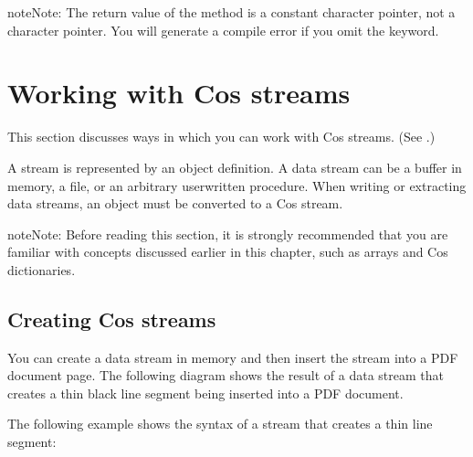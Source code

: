 \documentclass[letterpaper,12pt,english,openany,oneside]{sphinxmanual}
\begin{document}
\begin{sphinxadmonition}{note}{Note:}
The return value of the  method is a constant character pointer, not a character pointer. You will generate a compile error if you omit the  keyword.
\end{sphinxadmonition}


\section{Working with Cos streams}
\label{\detokenize{Plugins_Cos:working-with-cos-streams}}
This section discusses ways in which you can work with Cos streams. (See .)

A stream is represented by an  object definition. A data stream can be a buffer in memory, a file, or an arbitrary user\sphinxhyphen{}written procedure. When writing or extracting data streams, an  object must be converted to a Cos stream.

\begin{sphinxadmonition}{note}{Note:}
Before reading this section, it is strongly recommended that you are familiar with concepts discussed earlier in this chapter, such as  arrays and Cos dictionaries.
\end{sphinxadmonition}


\subsection{Creating Cos streams}
\label{\detokenize{Plugins_Cos:creating-cos-streams}}
You can create a data stream in memory and then insert the stream into a PDF document page. The following diagram shows the result of a data stream that creates a thin black line segment being inserted into a PDF document.

\noindent{}

The following example shows the syntax of a stream that creates a thin line segment:

\begin{sphinxVerbatim}[commandchars=\\\{\}]
      
\end{sphinxVerbatim}
\end{document}
